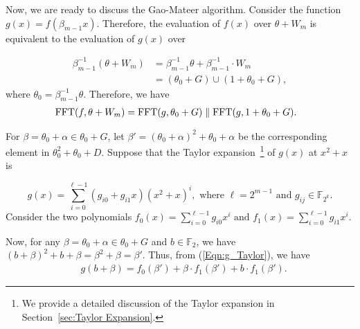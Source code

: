 


\noindent Now, we are ready to discuss the Gao-Mateer algorithm. Consider the function $g(x)=f(\beta_{m-1}x)$. Therefore, the evaluation of $f(x)$ over $\theta+W_m$ is equivalent to the evaluation of $g(x)$ over

\begin{equation*}
	\begin{aligned}
		\beta_{m-1}^{-1}(\theta+W_m)
		&=\beta_{m-1}^{-1} \theta+ \beta_{m-1}^{-1}\cdot W_m\\
		&=(\theta_0+G) \cup (1+\theta_0+G),
	\end{aligned}
\end{equation*}
where $\theta_0= \beta_{m-1}^{-1} \theta$. Therefore, we have
\begin{equation*}
	\begin{aligned}
		&\operatorname{FFT}(f,\theta+W_m)=\operatorname{FFT}(g,\theta_0+G)\parallel \operatorname{FFT}(g,1+\theta_0+G).
	\end{aligned}
\end{equation*}

For $\beta=\theta_0+\alpha \in \theta_0+G$, let $\beta'=(\theta_0+\alpha)^2+\theta_0+\alpha$ be the corresponding element in $\theta_0^2+\theta_0+D$. Suppose that the Taylor expansion~\footnote{We provide a detailed discussion of the Taylor expansion in Section~\ref{sec:Taylor Expansion}.} of $g(x)$ at $x^2+x$ is

\begin{equation}\label{Eqn:g_Taylor}
	g(x)=\displaystyle{\sum_{i=0}^{\ell-1}(g_{i0}+g_{i1}x)(x^2+x)^i }, \text{ where } \ell=2^{m-1} \text{ and } g_{ij}\in \mathbb{F}_{2^k}.
\end{equation}
Consider the two polynomials $f_{0}(x)= \sum_{i=0}^{\ell-1}g_{i0}x^i \text{ and } f_{1}(x)= \sum_{i=0}^{\ell-1}g_{i1}x^i.$

Now, for any $\beta=\theta_0+\alpha \in \theta_0+G$ and $b\in \mathbb{F}_{2}$, we have $(b+\beta)^2+b+\beta=\beta^2+\beta=\beta'$. Thus, from (\ref{Eqn:g_Taylor}), we have
\begin{equation}\label{Eqn:Gao-FFT}
	\begin{aligned}
		&g(b+\beta)= f_{0}(\beta')+ \beta \cdot f_1(\beta')+b\cdot f_1(\beta').
	\end{aligned}
\end{equation}

